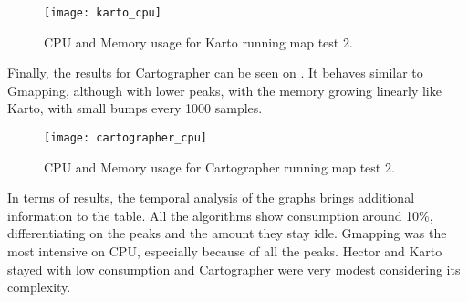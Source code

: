 \begin{figure}[!ht]
    \centering
    \texttt{[image: karto\_cpu]}
    \caption{CPU and Memory usage for Karto running map test 2.}
    \label{fig:karto_cpu}
\end{figure}

Finally, the results for Cartographer can be seen on . It behaves similar to Gmapping, although with lower peaks, with the memory growing linearly like Karto, with small bumps every 1000 samples.

\begin{figure}[!ht]
    \centering
    \texttt{[image: cartographer\_cpu]}
    \caption{CPU and Memory usage for Cartographer running map test 2.}
    \label{fig:cartographer_cpu}
\end{figure}

In terms of results, the temporal analysis of the graphs brings additional information to the table. All the algorithms show consumption around 10\%, differentiating on the peaks and the amount they stay idle. Gmapping was the most intensive on CPU, especially because of all the peaks. Hector and Karto stayed with low consumption and Cartographer were very modest considering its complexity. 